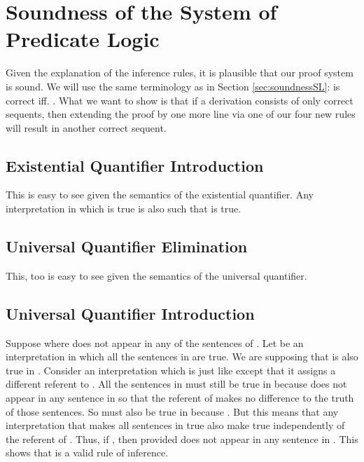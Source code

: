 \section{Soundness of the System of Predicate Logic}

Given the explanation of the inference rules, it is plausible that our proof 
system is sound.  We will use the same terminology as in Section
\ref{sec:soundnessSL}: \p{ \Gamma \lproves \phi} is correct iff. \p{ \Gamma 
\lentails \phi}.  What we want to show is that if a derivation consists of only 
correct sequents, then extending the proof by one more line via one of our four 
new rules will result in another correct sequent. 


\subsection{Existential Quantifier Introduction}

This is easy to see given the semantics of the existential quantifier. Any 
interpretation in which  is true is also such that  is true.

\subsection{Universal Quantifier Elimination}

This, too is easy to see given the semantics of the universal quantifier.

\subsection{Universal Quantifier Introduction}

Suppose  where  does not appear in any of the 
sentences of \p{\Gamma}. Let  be an interpretation in which all 
the sentences in \p{\Gamma} are true. We are supposing that  is also 
true in . Consider an interpretation  which is 
just like  except that it assigns a different referent to .  
All the sentences in \p{\Gamma} must still be true in  because 
 does not appear in any sentence in \p{\Gamma} so that the referent of  
makes no difference to the truth of those sentences. So  must also be 
true in  because . But this means 
that any interpretation that makes all sentences in \p{\Gamma} true also make 
 true independently of the referent of . Thus, if , then  provided  
does not appear in any sentence in \p{\Gamma}. This shows that \uniI{} is a 
valid rule of inference.



